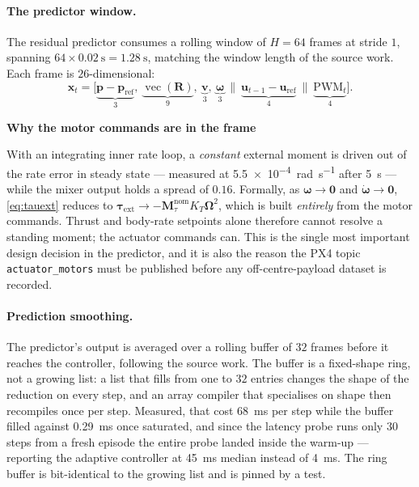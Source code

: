 \documentclass[11pt,a4paper,twoside,openright]{report}
\newcommand{\vH}{64}                     %
\newcommand{\vFrame}{26}                 %
\newcommand{\vSmooth}{32}                %
\newcommand{\vecop}{\operatorname{vec}}
\renewcommand{\vec}[1]{\bm{#1}}
\newcommand{\mat}[1]{\bm{#1}}
\newcommand{\inp}{\vec{u}}
\newcommand{\bodyrate}{\vec{\omega}}
\newcommand{\refsym}{\mathrm{ref}}
\theoremstyle{plain}
\theoremstyle{definition}
\theoremstyle{remark}
\newcommand{\keyhead}[1]{\textbf{\sffamily\small\textcolor{NavyDeep}{#1}}\par\vspace{2pt}}
\begin{document}
	\paragraph{The predictor window.} The residual predictor consumes a rolling
	window of $H=\vH$ frames at stride $1$, spanning
	$\vH\times\SI{0.02}{\second}=\SI{1.28}{\second}$, matching the window length of
	the source work. Each frame is $\vFrame$-dimensional:
	\begin{equation}
		\vec x_t=\Big[\underbrace{\vec p-\vec p_\refsym}_{3},\ \underbrace{\vecop(\mat R)}_{9},\
		\underbrace{\vec v}_{3},\ \underbrace{\bodyrate}_{3}\ \Big\|\
		\underbrace{\inp_{t-1}-\inp_\refsym}_{4}\ \Big\|\ \underbrace{\mathrm{PWM}_t}_{4}\Big].
		\label{eq:rdpframe}
	\end{equation}

	\begin{keybox}
		\keyhead{Why the motor commands are in the frame}
		With an integrating inner rate loop, a \emph{constant} external moment is driven
		out of the rate error in steady state --- measured at
		\SI{5.5e-4}{\radian\per\second} after \SI{5}{\second} --- while the mixer output
		holds a spread of $\num{0.16}$. Formally, as $\bodyrate\to\vec 0$ and
		$\dot{\bodyrate}\to\vec 0$, \cref{eq:tauext} reduces to
		$\vec\tau_\mathrm{ext}\to-\mat M_\tau^\mathrm{nom}K_T\vec\Omega^2$, which is built
		\emph{entirely} from the motor commands. Thrust and body-rate setpoints alone
		therefore cannot resolve a standing moment; the actuator commands can. This is
		the single most important design decision in the predictor, and it is also the
		reason the PX4 topic \texttt{actuator\_motors} must be published before any
		off-centre-payload dataset is recorded.
	\end{keybox}

	\paragraph{Prediction smoothing.} The predictor's output is averaged over a
	rolling buffer of $\vSmooth$ frames before it reaches the controller, following
	the source work. The buffer is a fixed-shape ring, not a growing list: a list
	that fills from one to $\vSmooth$ entries changes the shape of the reduction on
	every step, and an array compiler that specialises on shape then recompiles once
	per step. Measured, that cost \SI{68}{\milli\second} per step while the buffer
	filled against \SI{0.29}{\milli\second} once saturated, and since the latency
	probe runs only $30$ steps from a fresh episode the entire probe landed inside
	the warm-up --- reporting the adaptive controller at \SI{45}{\milli\second}
	median instead of \SI{4}{\milli\second}. The ring buffer is bit-identical to the
	growing list and is pinned by a test.
\end{document}
